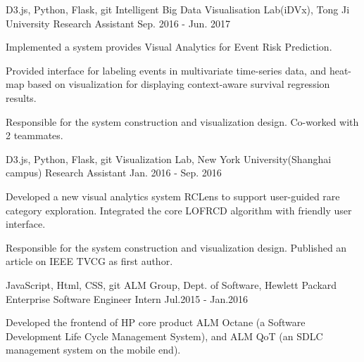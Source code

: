 


\begin{cventries}


\cventry
{D3.js, Python, Flask, git} %
{Intelligent Big Data Visualisation Lab(iDVx), Tong Ji University} %
{Research Assistant} %
{Sep. 2016 - Jun. 2017} %
{ %
\begin{cvitems}
\item {Implemented a system provides Visual Analytics for Event Risk Prediction.}
\item { Provided interface for labeling events in multivariate time-series data, and heat-map based on visualization for displaying context-aware survival regression results. }
\item {Responsible for the system construction and visualization design. Co-worked with 2 teammates. }
\end{cvitems} 
}

\cventry
{D3.js, Python, Flask, git} %
{Visualization Lab, New York University(Shanghai campus)} %
{Research Assistant} %
{Jan. 2016 - Sep. 2016} %
{ %
\begin{cvitems}
\item {Developed a new visual analytics system RCLens to support user-guided rare category exploration. Integrated the core LOFRCD algorithm with friendly user interface.}
\item {Responsible for the system construction and visualization design. Published an article on IEEE TVCG as first author.}
\end{cvitems}
}


\cventry
{JavaScript, Html, CSS, git} %
{ALM Group, Dept. of Software, Hewlett Packard Enterprise} %
{Software Engineer Intern} %
{Jul.2015 - Jan.2016} %
{ %
\begin{cvitems}
\item {Developed the frontend of HP core product ALM  Octane  (a Software Development Life Cycle Management System), and ALM QoT (an SDLC management system on the mobile end).}
\end{cvitems}
}





\end{cventries}